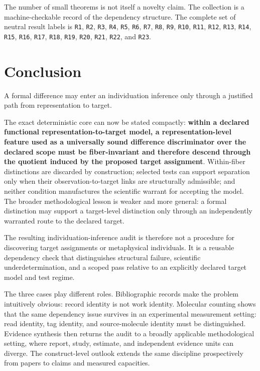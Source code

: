\documentclass[11pt]{article}
\begin{document}
The number of small theorems is not itself a novelty claim. The collection is a machine-checkable record of the dependency structure. The complete set of neutral result labels is \texttt{R1}, \texttt{R2}, \texttt{R3}, \texttt{R4}, \texttt{R5}, \texttt{R6}, \texttt{R7}, \texttt{R8}, \texttt{R9}, \texttt{R10}, \texttt{R11}, \texttt{R12}, \texttt{R13}, \texttt{R14}, \texttt{R15}, \texttt{R16}, \texttt{R17}, \texttt{R18}, \texttt{R19}, \texttt{R20}, \texttt{R21}, \texttt{R22}, and \texttt{R23}.

\section{Conclusion}

A formal difference may enter an individuation inference only through a justified path from representation to target.

The exact deterministic core can now be stated compactly: \textbf{within a declared functional representation-to-target model, a representation-level feature used as a universally sound difference discriminator over the declared scope must be fiber-invariant and therefore descend through the quotient induced by the proposed target assignment}. Within-fiber distinctions are discarded by construction; selected tests can support separation only when their observation-to-target links are structurally admissible; and neither condition manufactures the scientific warrant for accepting the model. The broader methodological lesson is weaker and more general: a formal distinction may support a target-level distinction only through an independently warranted route to the declared target.

The resulting individuation-inference audit is therefore not a procedure for discovering target assignments or metaphysical individuals. It is a reusable dependency check that distinguishes structural failure, scientific underdetermination, and a scoped pass relative to an explicitly declared target model and test regime.

The three cases play different roles. Bibliographic records make the problem intuitively obvious: record identity is not work identity. Molecular counting shows that the same dependency issue survives in an experimental measurement setting: read identity, tag identity, and source-molecule identity must be distinguished. Evidence synthesis then returns the audit to a broadly applicable methodological setting, where report, study, estimate, and independent evidence units can diverge. The construct-level outlook extends the same discipline prospectively from papers to claims and measured capacities.
\end{document}
